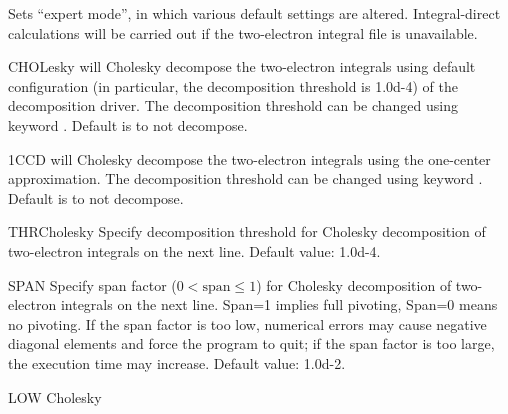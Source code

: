 \begin{keywordlist}
Sets ``expert mode'', in which various default settings are
altered. Integral-{}direct calculations will be carried out
if the two-{}electron integral file is unavailable.
\item[CHOLesky]
 will Cholesky decompose the two-{}electron integrals using
default configuration (in particular, the decomposition threshold is
1.0d{}-4) of the decomposition driver.
The decomposition threshold can be changed using keyword .
Default is to not decompose.
\item[1CCD]
 will Cholesky decompose the two-{}electron integrals using
the one-center approximation.
The decomposition threshold can be changed using keyword .
Default is to not decompose.
\item[THRCholesky]
Specify decomposition threshold for Cholesky decomposition of two-{}electron integrals
on the next line. Default value: 1.0d{}-4.
\item[SPAN]
Specify span factor ($0 < \mbox{span} \leq 1$) for Cholesky decomposition of two-electron integrals on the next line.
Span=1 implies full pivoting, Span=0 means no pivoting. If the span factor is too low, numerical errors may cause
negative diagonal elements and force the program to quit; if the span factor is too large, the execution time may
increase. Default value: 1.0d{}-2.
\item[LOW Cholesky]

\end{keywordlist}

